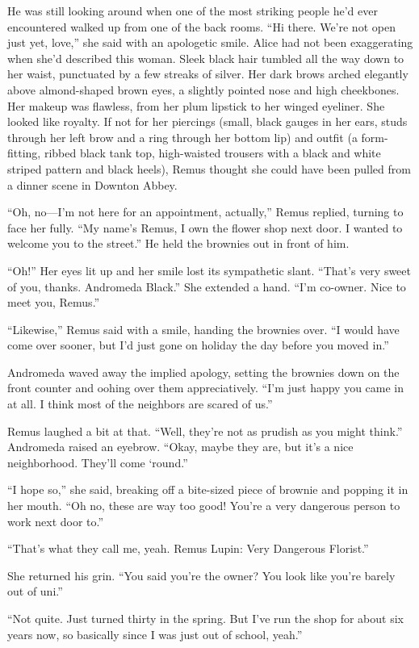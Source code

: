 He was still looking around when one of the most striking people he’d ever encountered walked up from one of the back rooms. “Hi there. We’re not open just yet, love,” she said with an apologetic smile. Alice had not been exaggerating when she’d described this woman. Sleek black hair tumbled all the way down to her waist, punctuated by a few streaks of silver. Her dark brows arched elegantly above almond-shaped brown eyes, a slightly pointed nose and high cheekbones. Her makeup was flawless, from her plum lipstick to her winged eyeliner. She looked like royalty. If not for her piercings (small, black gauges in her ears, studs through her left brow and a ring through her bottom lip) and outfit (a form-fitting, ribbed black tank top, high-waisted trousers with a black and white striped pattern and black heels), Remus thought she could have been pulled from a dinner scene in Downton Abbey.

“Oh, no—I’m not here for an appointment, actually,” Remus replied, turning to face her fully. “My name’s Remus, I own the flower shop next door. I wanted to welcome you to the street.” He held the brownies out in front of him.

“Oh!” Her eyes lit up and her smile lost its sympathetic slant. “That’s very sweet of you, thanks. Andromeda Black.” She extended a hand. “I’m co-owner. Nice to meet you, Remus.”

“Likewise,” Remus said with a smile, handing the brownies over. “I would have come over sooner, but I’d just gone on holiday the day before you moved in.”

Andromeda waved away the implied apology, setting the brownies down on the front counter and oohing over them appreciatively. “I’m just happy you came in at all. I think most of the neighbors are scared of us.”

Remus laughed a bit at that. “Well, they’re not as prudish as you might think.” Andromeda raised an eyebrow. “Okay, maybe they are, but it’s a nice neighborhood. They’ll come ‘round.”

“I hope so,” she said, breaking off a bite-sized piece of brownie and popping it in her mouth. “Oh no, these are way too good! You’re a very dangerous person to work next door to.”

“That’s what they call me, yeah. Remus Lupin: Very Dangerous Florist.”

She returned his grin. “You said you’re the owner? You look like you’re barely out of uni.”

“Not quite. Just turned thirty in the spring. But I’ve run the shop for about six years now, so basically since I was just out of school, yeah.”

